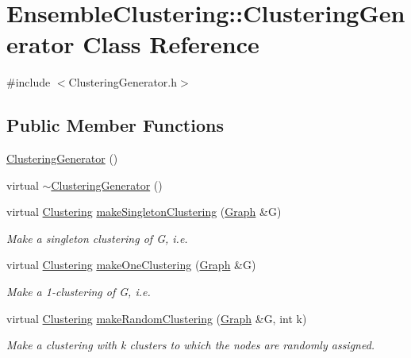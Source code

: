 \hypertarget{class_ensemble_clustering_1_1_clustering_generator}{\section{Ensemble\-Clustering\-:\-:Clustering\-Generator Class Reference}
\label{class_ensemble_clustering_1_1_clustering_generator}
}


{\ttfamily \#include $<$Clustering\-Generator.\-h$>$}

\subsection*{Public Member Functions}
\begin{DoxyCompactItemize}
\item 
\hyperlink{class_ensemble_clustering_1_1_clustering_generator_ab0903498f00fe5fcf2f60e7c51c500f4}{Clustering\-Generator} ()
\item 
virtual \hyperlink{class_ensemble_clustering_1_1_clustering_generator_afd7d065d414d8f51fe584df2bc79577c}{$\sim$\-Clustering\-Generator} ()
\item 
virtual \hyperlink{class_ensemble_clustering_1_1_clustering}{Clustering} \hyperlink{class_ensemble_clustering_1_1_clustering_generator_a51906150a30e960243d720668fda0ab4}{make\-Singleton\-Clustering} (\hyperlink{class_ensemble_clustering_1_1_graph}{Graph} \&G)
\begin{DoxyCompactList}\small\item\em Make a singleton clustering of G, i.\-e. \end{DoxyCompactList}\item 
virtual \hyperlink{class_ensemble_clustering_1_1_clustering}{Clustering} \hyperlink{class_ensemble_clustering_1_1_clustering_generator_aba77ffb1a767d6004f5f79ec0abf82a0}{make\-One\-Clustering} (\hyperlink{class_ensemble_clustering_1_1_graph}{Graph} \&G)
\begin{DoxyCompactList}\small\item\em Make a 1-\/clustering of G, i.\-e. \end{DoxyCompactList}\item 
virtual \hyperlink{class_ensemble_clustering_1_1_clustering}{Clustering} \hyperlink{class_ensemble_clustering_1_1_clustering_generator_ad5e71f42a81b05bc2d2d9ce6c16e1443}{make\-Random\-Clustering} (\hyperlink{class_ensemble_clustering_1_1_graph}{Graph} \&G, int k)
\begin{DoxyCompactList}\small\item\em Make a clustering with k clusters to which the nodes are randomly assigned. \end{DoxyCompactList}\end{DoxyCompactItemize}


